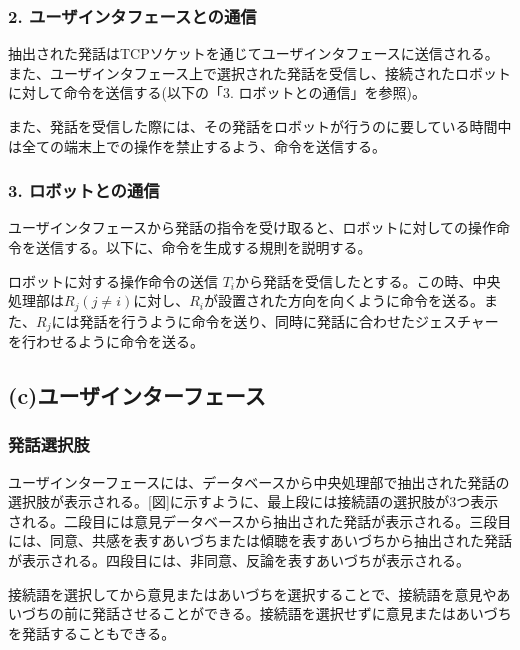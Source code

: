 \documentclass[11pt, a4paper]{jreport} %
\begin{document}
\subsubsection{2. ユーザインタフェースとの通信}
抽出された発話はTCPソケットを通じてユーザインタフェースに送信される。また、ユーザインタフェース上で選択された発話を受信し、接続されたロボットに対して命令を送信する(以下の「3. ロボットとの通信」を参照)。


また、発話を受信した際には、その発話をロボットが行うのに要している時間中は全ての端末上での操作を禁止するよう、命令を送信する。


\subsubsection{3. ロボットとの通信}
ユーザインタフェースから発話の指令を受け取ると、ロボットに対しての操作命令を送信する。以下に、命令を生成する規則を説明する。
\begin{itembox}[l]{ロボットに対する操作命令の送信}
$T_i$から発話を受信したとする。この時、中央処理部は$R_j (j \neq i)$に対し、$R_i$が設置された方向を向くように命令を送る。また、$R_j$には発話を行うように命令を送り、同時に発話に合わせたジェスチャーを行わせるように命令を送る。%


\end{itembox}


\subsection*{(c)ユーザインターフェース}
\subsubsection*{発話選択肢}
ユーザインターフェースには、データベースから中央処理部で抽出された発話の選択肢が表示される。[図]に示すように、最上段には接続語の選択肢が3つ表示される。二段目には意見データベースから抽出された発話が表示される。三段目には、同意、共感を表すあいづちまたは傾聴を表すあいづちから抽出された発話が表示される。四段目には、非同意、反論を表すあいづちが表示される。


接続語を選択してから意見またはあいづちを選択することで、接続語を意見やあいづちの前に発話させることができる。接続語を選択せずに意見またはあいづちを発話することもできる。
\end{document}
